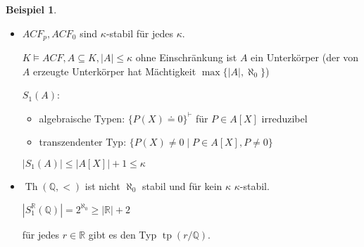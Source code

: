 \documentclass[12pt,parskip=full]{scrartcl}
\newcommand{\setQ}{\mathbb{Q}}
\newcommand{\setR}{\mathbb{R}}
\newcommand{\abs}[1]{{\left| #1 \right|}}
\theoremstyle{definition}
\newtheorem{example}[theorem]{Beispiel}
\begin{document}
	\begin{example}
		\begin{itemize}
			\item $ACF_p, ACF_0$ sind $\kappa$-stabil für jedes $\kappa$.
			
			$K \models ACF, A \subseteq K, \abs{A} \leq \kappa$ ohne Einschränkung ist $A$ ein Unterkörper (der von $A$ erzeugte Unterkörper hat Mächtigkeit $\max \{ \abs{A}, \aleph_0 \}$)
			
			$S_1(A)$:
			\begin{itemize}
				\item algebraische Typen: $\{ P(X) \doteq 0 \}^\vdash$ für $P \in A[X]$ irreduzibel
				\item transzendenter Typ: $\{ P(X) \neq 0 \mid P \in A[X], P \neq 0 \}$
			\end{itemize}
		
			$\abs{S_1(A)} \leq \abs{A[X]} + 1 \leq \kappa$
			
			\item $\operatorname{Th}(\setQ, <)$ ist nicht $\aleph_0$ stabil und für kein $\kappa$ $\kappa$-stabil.
			
			$\abs{S_1^\setR(\setQ)} = 2^{\aleph_0} \geq \abs{\setR} + 2$
			
			für jedes $r \in \setR$ gibt es den Typ $\operatorname{tp}(r/\setQ)$.
		\end{itemize}
	\end{example}
\end{document}

